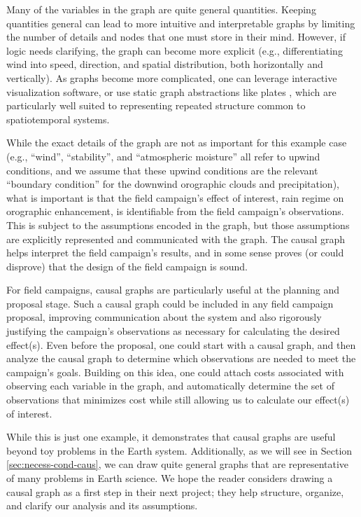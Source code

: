 \documentclass[12pt]{article}
\begin{document}
Many of the variables in the graph are quite general
quantities. Keeping quantities general can lead to more intuitive and
interpretable graphs by limiting the number of details and nodes that
one must store in their mind. However, if logic needs clarifying, the
graph can become more explicit (e.g., differentiating wind into speed,
direction, and spatial distribution, both horizontally and
vertically). As graphs become more complicated, one can leverage
interactive visualization software, or use static graph abstractions
like plates \citep{bishop2006pattern}, which are particularly well
suited to representing repeated structure common to spatiotemporal
systems.

While the exact details of the graph are not as important for this
example case (e.g., ``wind'', ``stability'', and ``atmospheric
moisture'' all refer to upwind conditions, and we assume that these
upwind conditions are the relevant ``boundary condition'' for the
downwind orographic clouds and precipitation), what is important is
that the field campaign's effect of interest, rain regime on
orographic enhancement, is identifiable from the field campaign's
observations. This is subject to the assumptions encoded in the graph,
but those assumptions are explicitly represented and communicated with
the graph. The causal graph helps interpret the field campaign's
results, and in some sense proves (or could disprove) that the design of the field
campaign is sound.

For field campaigns, causal graphs are particularly useful at the
planning and proposal stage. Such a causal graph could be included in
any field campaign proposal, improving communication about the system
and also rigorously justifying the campaign’s observations as
necessary for calculating the desired effect(s). Even before the
proposal, one could start with a causal graph, and then analyze the
causal graph to determine which observations are needed to meet the
campaign’s goals. Building on this idea, one could attach costs
associated with observing each variable in the graph, and
automatically determine the set of observations that minimizes cost
while still allowing us to calculate our effect(s) of interest.

While this is just one example, it demonstrates that causal graphs are
useful beyond toy problems in the Earth system. Additionally, as we
will see in Section \ref{sec:necess-cond-caus}, we can draw quite
general graphs that are representative of many problems in Earth
science. We hope the reader considers drawing a causal graph as a
first step in their next project; they help structure, organize, and
clarify our analysis and its assumptions.
\end{document}
